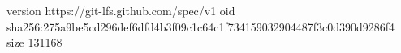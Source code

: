 version https://git-lfs.github.com/spec/v1
oid sha256:275a9be5cd296def6dfd4b3f09c1c64c1f734159032904487f3c0d390d9286f4
size 131168
